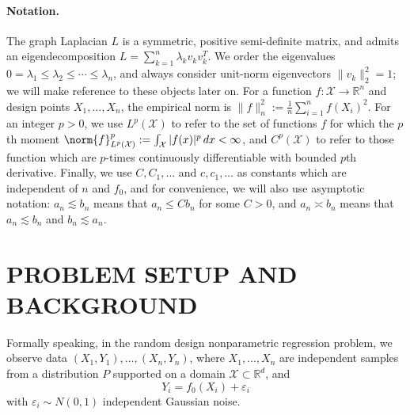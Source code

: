 \documentclass[twoside]{article}
\newcommand{\Reals}{\mathbb{R}}
\newcommand{\1}{\mathbf{1}}
\newcommand{\Xset}{\mathcal{X}}
\newcommand{\Leb}{L}
\theoremstyle{definition}
\theoremstyle{remark}
\begin{document}
\paragraph{Notation.}
The graph Laplacian $L$ is a symmetric, positive semi-definite matrix, and admits an eigendecomposition $L = \sum_{k = 1}^{n} \lambda_k v_k v_k^T$. We order the eigenvalues $0 = \lambda_1 \leq \lambda_2 \leq \cdots \leq \lambda_n$, and always consider unit-norm eigenvectors $\|v_k\|_2^2 = 1$; we will make reference to these objects later on. For a function $f: \Xset \to \Reals^n$ and design points $X_1,\ldots,X_n$, the empirical norm is $\|f\|_n^2 := \frac{1}{n}\sum_{i = 1}^{n} f(X_i)^2$. For an integer $p > 0$, we use $\Leb^p(\Xset)$ to refer to the set of functions $f$ for which the $p$th moment $\norm{f}_{\Leb^p(\Xset)}^p := \int_{\Xset} |f(x)|^p \,dx < \infty$, and $C^p(\Xset)$ to refer to those function which are $p$-times continuously differentiable with bounded $p$th derivative. Finally, we use $C,C_1,\ldots$ and $c,c_1,\ldots$ as constants which are independent of $n$ and $f_0$, and for convenience, we will also use asymptotic notation: $a_n \lesssim b_n$ means that $a_n \leq Cb_n$ for some $C > 0$, and $a_n \asymp b_n$ means that $a_n \lesssim b_n$ and $b_n \lesssim a_n$.

\section{PROBLEM SETUP AND BACKGROUND}
\label{sec:problem_setup_and_background}
Formally speaking, in the random design nonparametric regression problem, we observe data $(X_1,Y_1),\ldots,(X_n,Y_n)$, where $X_1,\ldots,X_n$ are independent samples from a distribution $P$ supported on a domain $\Xset \subset \Reals^d$, and 
\begin{equation}
\label{eqn:random_design_regression}
Y_i = f_0(X_i) + \varepsilon_i
\end{equation}
with $\varepsilon_i \sim N(0,1)$ independent Gaussian noise. 
\end{document}
